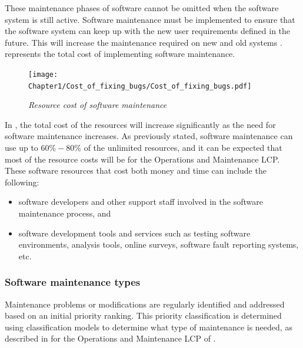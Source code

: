 These maintenance phases of software cannot be omitted when the software system is still active. Software maintenance must be implemented to ensure that the software system can keep up with the new user requirements defined in the future. This will increase the maintenance required on new and old systems \cite{Niu2018, Galster2019, Hasan2012}.  represents the total cost of implementing software maintenance.

\begin{figure}[!htb]
	\centering %
	\texttt{[image: Chapter1/Cost\_of\_fixing\_bugs/Cost\_of\_fixing\_bugs.pdf]}
	\caption[Resource cost of software maintenance]
	{\textit{Resource cost of software maintenance \cite{Ogheneovo2014}}}\label{fig:ch1_costsOfFixingBugs}
\end{figure}

In , the total cost of the resources will increase significantly as the need for software maintenance increases. As previously stated, software maintenance can use up to $60\%-80\%$ of the unlimited resources, and it can be expected that most of the resource costs will be for the Operations and Maintenance LCP. These software resources that cost both money and time can include the following:

\begin{itemize}
	\item software developers and other support staff involved in the software maintenance process, and
	\item software development tools and services such as testing software environments, analysis tools, online surveys, software fault reporting systems, etc.
\end{itemize}

\subsubsection{Software maintenance types}

Maintenance problems or modifications are regularly identified and addressed based on an initial priority ranking. This priority classification is determined using classification models to determine what type of maintenance is needed, as described in  for the Operations and Maintenance LCP of  \cite{Tang2010, Ping2010}.


